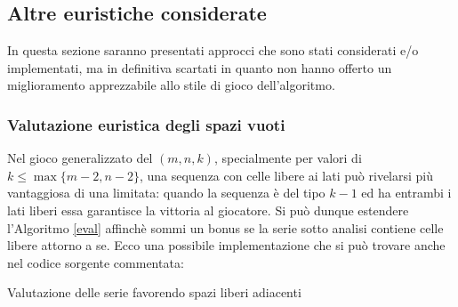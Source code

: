 \documentclass{article}
\begin{document}
\subsection*{Altre euristiche considerate}

In questa sezione saranno presentati approcci che sono stati considerati
e/o implementati, ma in definitiva scartati in quanto non hanno offerto un
miglioramento apprezzabile allo stile di gioco dell'algoritmo.

\subsubsection*{Valutazione euristica degli spazi vuoti}

Nel gioco generalizzato del $(m, n, k)$, specialmente per valori di $k \leq \max\{m-2,n-2\}$,
una sequenza con celle libere ai lati pu\`o rivelarsi pi\`u vantaggiosa di una
limitata: quando la sequenza \`e del tipo $k-1$ ed ha entrambi i lati liberi
essa garantisce la vittoria al giocatore. Si pu\`o dunque estendere l'Algoritmo
\vref{eval} affinch\`e sommi un bonus se la serie sotto analisi contiene celle
libere attorno a se. Ecco una possibile implementazione che si pu\`o trovare
anche nel codice sorgente commentata:

\begin{algorithm}[H]
  \label{eval+free}
  \caption{Valutazione delle serie favorendo spazi liberi adiacenti}


\end{algorithm}


\pagebreak


\end{document}
